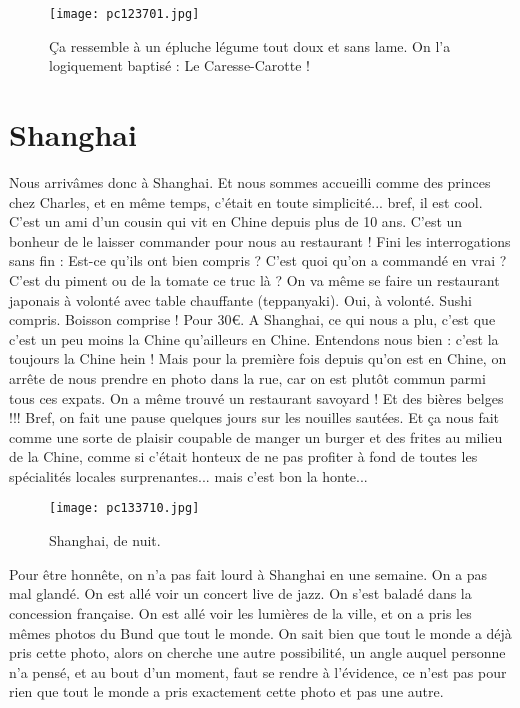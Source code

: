 \documentclass{book}
\begin{document}
\begin{figure}[h]
\centering
\texttt{[image: pc123701.jpg]}
\caption*{Ça ressemble à un épluche légume tout doux et sans lame. On l'a logiquement baptisé : Le Caresse-Carotte !}
\end{figure}



\chapter{Shanghai}
Nous arrivâmes donc à Shanghai. Et nous sommes accueilli comme des princes chez Charles, et en même temps, c'était en toute simplicité... bref, il est cool. C'est un ami d'un cousin qui vit en Chine depuis plus de 10 ans. C'est un bonheur de le laisser commander pour nous au restaurant ! Fini les interrogations sans fin : Est-ce qu'ils ont bien compris ? C'est quoi qu'on a commandé en vrai ? C'est du piment ou de la tomate ce truc là ? On va même se faire un restaurant japonais à volonté avec table chauffante (teppanyaki). Oui, à volonté. Sushi compris. Boisson comprise ! Pour 30\euro. A Shanghai, ce qui nous a plu, c'est que c'est un peu moins la Chine qu'ailleurs en Chine. Entendons nous bien : c'est la toujours la Chine hein ! Mais pour la première fois depuis qu'on est en Chine, on arrête de nous prendre en photo dans la rue, car on est plutôt commun parmi tous ces expats. On a même trouvé un restaurant savoyard ! Et des bières belges !!! Bref, on fait une pause quelques jours sur les nouilles sautées. Et ça nous fait comme une sorte de plaisir coupable de manger un burger et des frites au milieu de la Chine, comme si c'était honteux de ne pas profiter à fond de toutes les spécialités locales surprenantes... mais c'est bon la honte...


\begin{figure}[h]
\centering
\texttt{[image: pc133710.jpg]}
\caption*{Shanghai, de nuit.}
\end{figure}

Pour être honnête, on n'a pas fait lourd à Shanghai en une semaine. On a pas mal glandé. On est allé voir un concert live de jazz. On s'est baladé dans la concession française. On est allé voir les lumières de la ville, et on a pris les mêmes photos du Bund que tout le monde. On sait bien que tout le monde a déjà pris cette photo, alors on cherche une autre possibilité, un angle auquel personne n'a pensé, et au bout d'un moment, faut se rendre à l'évidence, ce n'est pas pour rien que tout le monde a pris exactement cette photo et pas une autre.
\end{document}

